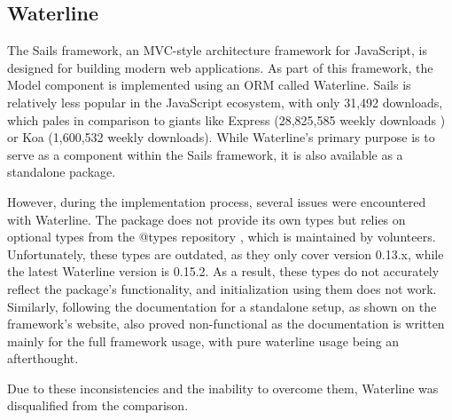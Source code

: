 \subsection{Waterline}

The Sails framework, an MVC-style architecture framework for JavaScript, is
designed for building modern web applications. As part of this framework, the
Model component is implemented using an ORM called Waterline. Sails is
relatively less popular in the JavaScript ecosystem, with only 31,492 downloads,
which pales in comparison to giants like Express (28,825,585 weekly downloads \cite{express_2022})
or Koa (1,600,532 weekly downloads). While Waterline's primary purpose is to
serve as a component within the Sails framework, it is also available as a
standalone package.

However, during the implementation process, several issues were encountered with
Waterline. The package does not provide its own types but relies on optional
types from the @types repository \cite{definitelytyped/types/waterline}, which
is maintained by volunteers. Unfortunately, these types are outdated, as they
only cover version 0.13.x, while the latest Waterline version is 0.15.2. As a
result, these types do not accurately reflect the package's functionality, and
initialization using them does not work. Similarly, following the documentation
for a standalone setup, as shown on the framework's website, also proved
non-functional as the documentation \cite{waterline-docs} is written mainly for the full framework
usage, with pure waterline usage being an afterthought.

Due to these inconsistencies and the inability to overcome them, Waterline was
disqualified from the comparison.